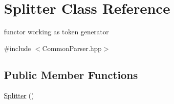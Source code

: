 \hypertarget{classSplitter}{
\section{Splitter Class Reference}
\label{classSplitter}
}


functor working as token generator  




{\ttfamily \#include $<$CommonParser.hpp$>$}

\subsection*{Public Member Functions}
\begin{DoxyCompactItemize}
\item 
\hypertarget{classSplitter_ac62b02b8374ebe8dfdf6c34fbd59c2a1}{
\hyperlink{classSplitter_ac62b02b8374ebe8dfdf6c34fbd59c2a1}{Splitter} ()}
\label{classSplitter_ac62b02b8374ebe8dfdf6c34fbd59c2a1}


\end{DoxyCompactItemize}
